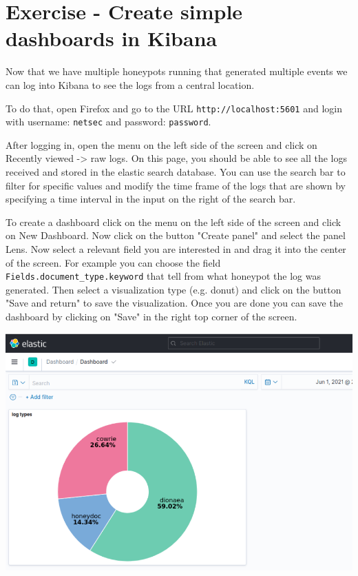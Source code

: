 \documentclass[epsfig,a4paper,11pt,titlepage,oneside,openany]{book}
\begin{document}
\section{Exercise - Create simple dashboards in Kibana}

Now that we have multiple honeypots running that generated multiple events we can log into Kibana to see the logs from a central location.

To do that, open Firefox and go to the URL \texttt{http://localhost:5601} and login with username: \texttt{netsec} and password: \texttt{password}.

After logging in, open the menu on the left side of the screen and click on Recently viewed -> raw logs. On this page, you should be able to see all the logs received and stored in the elastic search database. You can use the search bar to filter for specific values and modify the time frame of the logs that are shown by specifying a time interval in the input on the right of the search bar.

To create a dashboard click on the menu on the left side of the screen and click on New Dashboard. Now click on the button "Create panel" and select the panel Lens. Now select a relevant field you are interested in and drag it into the center of the screen. For example you can choose the field \texttt{Fields.document\_type.keyword} that tell from  what honeypot the log was generated. Then select a visualization type (e.g. donut) and click on the button "Save and return" to save the visualization. Once you are done you can save the dashboard by clicking on "Save" in the right top corner of the screen.

\begin{center}
\includegraphics[scale=0.35]{kibana}
\end{center}
\end{document}
